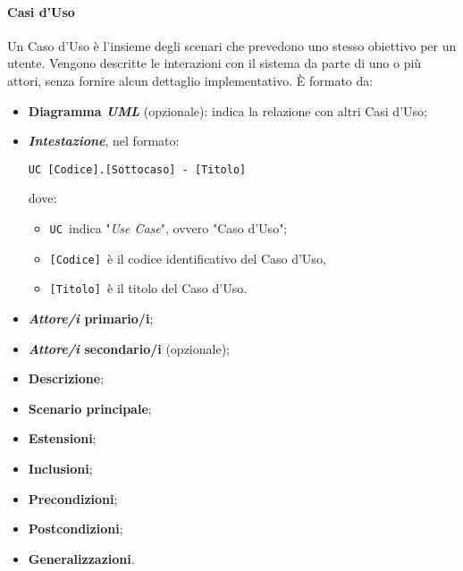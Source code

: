 \documentclass[a4paper, 12pt]{article}
\begin{document}
\paragraph{Casi d'Uso}
Un Caso d'Uso è l'insieme degli scenari che prevedono uno stesso obiettivo per
un utente. Vengono descritte le interazioni con il sistema da parte di uno o più
attori, senza fornire alcun dettaglio implementativo. È formato da:
\begin{itemize}
    \item \textbf{Diagramma \textit{UML}} (opzionale): indica la relazione con
    altri Casi d'Uso;
    \item \textit{\textbf{Intestazione}}, nel formato:
    \begin{center}
        \begin{BVerbatim}
UC [Codice].[Sottocaso] - [Titolo]
        \end{BVerbatim}   
    \end{center}
    dove:
    \begin{itemize}
        \item \Verb^UC ^indica "\textit{Use Case}", ovvero "Caso d'Uso";
        \item \Verb^[Codice] ^è il codice identificativo del Caso d'Uso, 
        \item \Verb^[Titolo] ^è il titolo del Caso d'Uso. 
    \end{itemize}
    \item \textbf{\textit{Attore/i} primario/i};
    \item \textbf{\textit{Attore/i} secondario/i} (opzionale);
    \item \textbf{Descrizione};
    \item \textbf{Scenario principale};
    \item \textbf{Estensioni};
    \item \textbf{Inclusioni};
    \item \textbf{Precondizioni};
    \item \textbf{Postcondizioni};
    \item \textbf{Generalizzazioni}.
\end{itemize}
\end{document}

